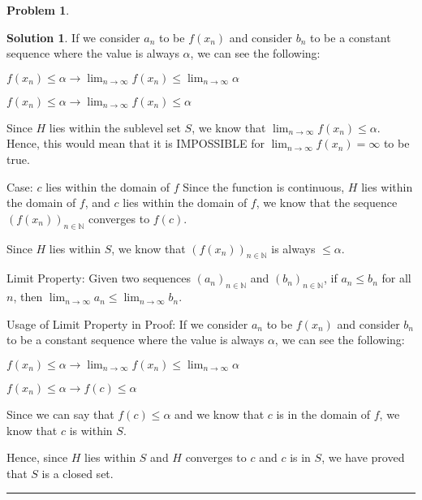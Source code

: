 \documentclass{article}
\theoremstyle{definition}
\newtheorem{problem}{Problem}
\def\fline{\rule{0.75\linewidth}{0.5pt}}
\newcommand{\finishline}{\begin{center}\fline\end{center}}
\newtheorem*{solution*}{Solution}
\newenvironment{solution}{\begin{solution*}}{{\finishline} \end{solution*}}
\begin{document}
\begin{problem}
\begin{solution}
If we consider $a_n$ to be $f(x_n)$ and consider $b_n$ to be a constant sequence where the value is always $\alpha$, we can see the following: \newline 

$f(x_n) \leq \alpha \rightarrow \lim_{n\to\infty} f(x_n) \leq \lim_{n\to\infty} \alpha$ \newline 

$f(x_n) \leq \alpha \rightarrow \lim_{n\to\infty} f(x_n) \leq  \alpha$ \newline 

Since $H$ lies within the sublevel set $S$, we know that $\lim_{n\to\infty} f(x_n) \leq  \alpha$. Hence, this would mean that it is IMPOSSIBLE for $\lim_{n\to\infty} f(x_n) = \infty$ to be true. \newline 

Case: $c$ lies within the domain of $f$ \newline 
Since the function is continuous, $H$ lies within the domain of $f$, and $c$ lies within the domain of $f$, we know that the sequence $(f(x_n))_{n \in \mathbb{N}}$ converges to $f(c)$. 

Since $H$ lies within $S$, we know that $(f(x_n))_{n \in \mathbb{N}}$ is always $\leq \alpha$. \newline 


Limit Property: \newline 
Given two sequences $(a_n)_{n \in \mathbb{N}}$ and $(b_n)_{n \in \mathbb{N}}$, if $a_n \leq b_n$ for all $n$, then  $\lim_{n\to\infty} a_n \leq \lim_{n\to\infty} b_n$. 

Usage of Limit Property in Proof: \newline 
If we consider $a_n$ to be $f(x_n)$ and consider $b_n$ to be a constant sequence where the value is always $\alpha$, we can see the following: \newline 

$f(x_n) \leq \alpha \rightarrow \lim_{n\to\infty} f(x_n) \leq \lim_{n\to\infty} \alpha$ \newline 

$f(x_n) \leq \alpha \rightarrow f(c) \leq \alpha$ \newline 

Since we can say that $f(c) \leq \alpha$ and we know that $c$ is in the domain of $f$, we know that $c$ is within $S$. \newline 


Hence, since $H$ lies within $S$ and $H$ converges to $c$ and $c$ is in $S$, we have proved that $S$ is a closed set. \newline 



\end{solution}
\end{problem}
\end{document}
